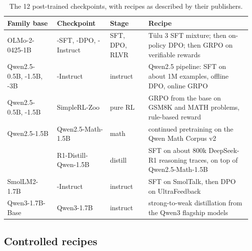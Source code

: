 \documentclass[11pt,a4paper]{article}
\theoremstyle{definition}
\begin{document}
\begin{table}[ht]
\centering\small
\caption{The 12 post-trained checkpoints, with recipes as described by their publishers.}
\label{tab:checkpoints}
\begin{tabularx}{\textwidth}{@{}l l l >{\raggedright\arraybackslash}X@{}}
\toprule
Family base & Checkpoint & Stage & Recipe \\
\midrule
OLMo-2-0425-1B & -SFT, -DPO, -Instruct & SFT, DPO, RLVR & T\"ulu 3 SFT mixture; then on-policy DPO; then GRPO
on verifiable rewards \\
Qwen2.5-0.5B, -1.5B, -3B & -Instruct & instruct & Qwen2.5 pipeline: SFT on about 1M examples, offline DPO, online
GRPO \\
Qwen2.5-0.5B, -1.5B & SimpleRL-Zoo & pure RL & GRPO from the base on GSM8K and MATH problems, rule-based reward \\
Qwen2.5-1.5B & Qwen2.5-Math-1.5B & math & continued pretraining on the Qwen Math Corpus v2 \\
 & R1-Distill-Qwen-1.5B & distill & SFT on about 800k DeepSeek-R1 reasoning traces, on top of Qwen2.5-Math-1.5B \\
SmolLM2-1.7B & -Instruct & instruct & SFT on SmolTalk, then DPO on UltraFeedback \\
Qwen3-1.7B-Base & Qwen3-1.7B & instruct & strong-to-weak distillation from the Qwen3 flagship models \\
\bottomrule
\end{tabularx}
\end{table}

\subsection{Controlled recipes}
\label{sec:recipes}
\end{document}
